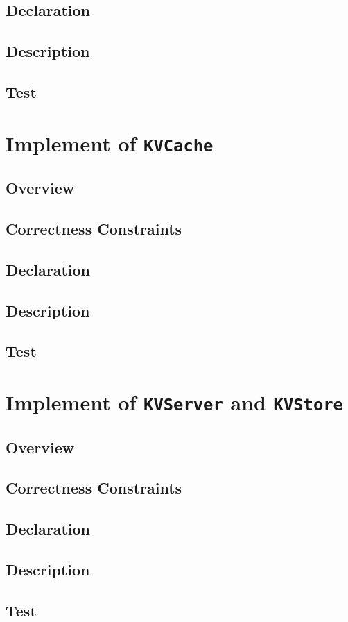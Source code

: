 \documentclass{article}
\begin{document}
\subsection{Declaration}
\subsection{Description}
\begin{algorithm}
	\begin{algorithmic}
		\EndProcedure
		\EndProcedure
		\EndProcedure
		\EndProcedure
	\end{algorithmic}
\end{algorithm}
\subsection{Test}

\section{Implement of \texttt{KVCache}}
\subsection{Overview}
\subsection{Correctness Constraints}
\subsection{Declaration}
\subsection{Description}
\subsection{Test}

\section{Implement of \texttt{KVServer} and \texttt{KVStore}}
\subsection{Overview}
\subsection{Correctness Constraints}
\subsection{Declaration}
\subsection{Description}
\subsection{Test}
\end{document}
